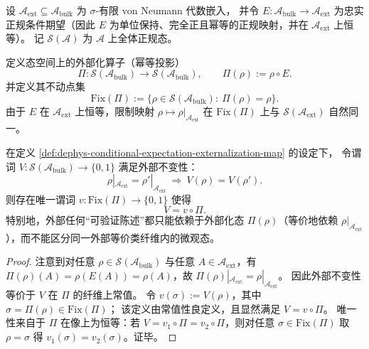 \begin{definition}[外部化通道与不动点态空间]\label{def:dephys-conditional-expectation-externalization-map}
设 \(\mathcal{A}_{\mathrm{ext}}\subseteq \mathcal{A}_{\mathrm{bulk}}\) 为 \(\sigma\)-有限 von Neumann 代数嵌入，
并令 \(E:\mathcal{A}_{\mathrm{bulk}}\to\mathcal{A}_{\mathrm{ext}}\) 为忠实正规条件期望（因此 \(E\) 为单位保持、完全正且幂等的正规映射，并在 \(\mathcal{A}_{\mathrm{ext}}\) 上恒等）。
记 \(\mathcal{S}(\mathcal{A})\) 为 \(\mathcal{A}\) 上全体正规态。
\par
定义态空间上的外部化算子（幂等投影）
\begin{equation}\label{eq:dephys-ext-externalization-Pi}
\boxed{\;
\Pi:\mathcal{S}(\mathcal{A}_{\mathrm{bulk}})\to \mathcal{S}(\mathcal{A}_{\mathrm{bulk}}),
\qquad
\Pi(\rho):=\rho\circ E.\;}
\end{equation}
并定义其不动点集
\[
\mathrm{Fix}(\Pi):=\{\rho\in\mathcal{S}(\mathcal{A}_{\mathrm{bulk}}):\ \Pi(\rho)=\rho\}.
\]
由于 \(E\) 在 \(\mathcal{A}_{\mathrm{ext}}\) 上恒等，限制映射 \(\rho\mapsto \rho|_{\mathcal{A}_{\mathrm{ext}}}\) 在 \(\mathrm{Fix}(\Pi)\) 上与 \(\mathcal{S}(\mathcal{A}_{\mathrm{ext}})\) 自然同一。
\end{definition}

\begin{proposition}\label{prop:dephys-horizon-sufficiency-zero-knowledge}
在定义 \ref{def:dephys-conditional-expectation-externalization-map} 的设定下，
令谓词 \(V:\mathcal{S}(\mathcal{A}_{\mathrm{bulk}})\to\{0,1\}\) 满足外部不变性：
\[
\rho|_{\mathcal{A}_{\mathrm{ext}}}=\rho'|_{\mathcal{A}_{\mathrm{ext}}}
\ \Longrightarrow\ 
V(\rho)=V(\rho').
\]
则存在唯一谓词 \(v:\mathrm{Fix}(\Pi)\to\{0,1\}\) 使得
\begin{equation}\label{eq:dephys-zero-knowledge-factorization-by-Pi}
\boxed{\;
V=v\circ\Pi.\;}
\end{equation}
特别地，外部任何“可验证陈述”都只能依赖于外部化态 \(\Pi(\rho)\)（等价地依赖 \(\rho|_{\mathcal{A}_{\mathrm{ext}}}\)），而不能区分同一外部等价类纤维内的微观态。
\end{proposition}

\begin{proof}
注意到对任意 \(\rho\in\mathcal{S}(\mathcal{A}_{\mathrm{bulk}})\) 与任意 \(A\in\mathcal{A}_{\mathrm{ext}}\)，有
\(
\Pi(\rho)(A)=\rho(E(A))=\rho(A)
\)，故 \(\Pi(\rho)|_{\mathcal{A}_{\mathrm{ext}}}=\rho|_{\mathcal{A}_{\mathrm{ext}}}\)。
因此外部不变性等价于 \(V\) 在 \(\Pi\) 的纤维上常值。
令 \(v(\sigma):=V(\rho)\)，其中 \(\sigma=\Pi(\rho)\in\mathrm{Fix}(\Pi)\)；
该定义由常值性良定义，且显然满足 \(V=v\circ\Pi\)。
唯一性来自于 \(\Pi\) 在像上为恒等：若 \(V=v_1\circ\Pi=v_2\circ\Pi\)，则对任意 \(\sigma\in\mathrm{Fix}(\Pi)\) 取 \(\rho=\sigma\) 得 \(v_1(\sigma)=v_2(\sigma)\)。证毕。
\end{proof}

